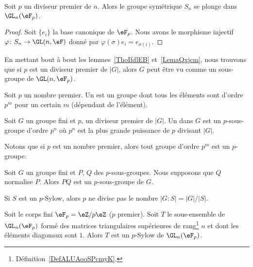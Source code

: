 \begin{lemma}       \label{LemaQxjcm}
	Soit \( p\) un diviseur premier de \( n\). Alors le groupe symétrique \( S_n\) se plonge dans \( \GL_n(\eF_p)\).
\end{lemma}

\begin{proof}
	Soit \( \{ e_i \}\) la base canonique de \( \eF_p\). Nous avons le morphisme injectif $\varphi\colon S_n\to \GL(n,\eF)$ donné par \( \varphi(\sigma)e_i=e_{\sigma(i)}\).
\end{proof}

\begin{remark}  \label{RemFzxxst}
	En mettant bout à bout les lemmes~\ref{ThoIfdlEB} et~\ref{LemaQxjcm}, nous trouvons que si \( p\) est un diviseur premier de \( | G |\), alors \( G\) peut être vu comme un sous-groupe de \( \GL(n,\eF_p)\).
\end{remark}

\begin{definition}      \label{DEFooPRCHooVZdwST}
	Soit \( p\) un nombre premier. Un  est un groupe dont tous les éléments sont d'ordre \( p^m\) pour un certain \( m\) (dépendant de l'élément).

	Soit \( G\) un groupe fini et \( p\), un diviseur premier de $| G |$. Un  dans \( G\) est un \( p\)-sous-groupe d'ordre \( p^n\) où \( p^n\) est la plus grande puissance de \( p\) divisant \( | G |\).
\end{definition}
Notons que si \( p\) est un nombre premier, alors tout groupe d'ordre \( p^m\) est un \( p\)-groupe.

\begin{lemma}
	Soit \( G\) un groupe fini et \( P\), \( Q\) des \( p\)-sous-groupes. Nous supposons que \( Q\) normalise \( P\). Alors \( PQ\) est un \( p\)-sous-groupe de \( G\).
\end{lemma}

Si \( S\) est un \( p\)-Sylow, alors \( p\) ne divise pas le nombre \( | G:S |=| G |/| S |\).

\begin{proposition}     \label{Propvocmon}
	Soit le corps fini \( \eF_p=\eZ/p\eZ\) (\( p\) premier). Soit \( T\) le sous-ensemble de \( \GL_n(\eF_p)\) formé des matrices triangulaires supérieures de rang\footnote{Définition~\ref{DefALUAooSPcmyK}.} \( n\) et dont les éléments diagonaux sont \( 1\). Alors \( T\) est un \( p\)-Sylow de \( \GL_n(\eF_p)\).
\end{proposition}

